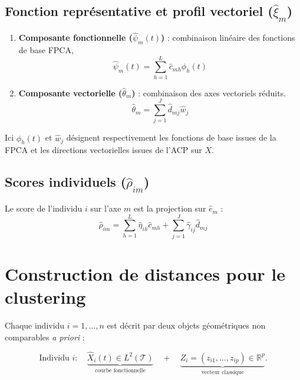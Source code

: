 \documentclass[11pt, a4paper]{article}
\newcommand{\R}{\mathbb{R}}
\newcommand{\Ltwo}{L^2(\mathcal{T})}
\begin{document}
\subsection{Fonction représentative et profil vectoriel ($\hat{\xi}_m$)}
\begin{enumerate}
    \item \textbf{Composante fonctionnelle ($\hat{\psi}_m(t)$)} : combinaison
    linéaire des fonctions de base FPCA,
    \begin{equation}
    \hat{\psi}_m(t) = \sum_{h=1}^L \hat{c}_{mh} \hat{\phi}_h(t)
    \end{equation}
    \item \textbf{Composante vectorielle ($\hat{\theta}_m$)} : combinaison
    des axes vectoriels réduits.
    \begin{equation}
    \hat{\theta}_m = \sum_{j=1}^J \hat{d}_{mj} \hat{w}_j
    \end{equation}
\end{enumerate}

Ici $\hat{\phi}_h(t)$ et $\hat{w}_j$ désignent respectivement les fonctions de
base issues de la FPCA et les directions vectorielles issues de l'ACP sur
$X$.

\subsection{Scores individuels ($\hat{\rho}_{im}$)}
Le score de l'individu $i$ sur l'axe $m$ est la projection sur $\hat{e}_m$ :
\begin{equation}
\hat{\rho}_{im} = \sum_{h=1}^L \hat{\eta}_{ih} \hat{c}_{mh} + \sum_{j=1}^J \hat{\gamma}_{ij} \hat{d}_{mj}
\end{equation}

\section{Construction de distances pour le clustering}

Chaque individu $i = 1, \ldots, n$ est décrit par deux objets géométriques
non comparables \emph{a priori} :

\[
  \text{Individu } i : \quad
  \underbrace{\hat{X}_i(t) \in \Ltwo}_{\text{courbe fonctionnelle}}
  \quad + \quad
  \underbrace{Z_i = (z_{i1}, \ldots, z_{ip}) \in \R^p}_{\text{vecteur classique}}.
\]
\end{document}
